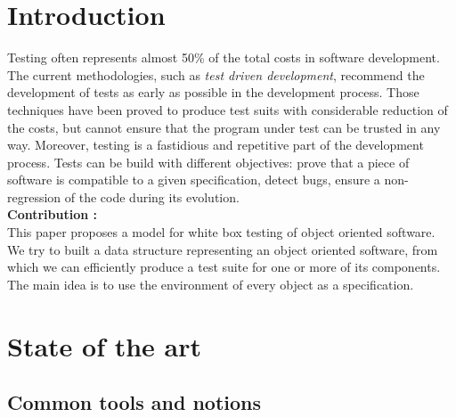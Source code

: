 \documentclass[a4paper]{report}
\begin{document}
\chapter*{Introduction}
Testing often represents almost 50\% of the total costs in software development. The current methodologies, such as \textit{test driven development}, recommend the development of tests as early as possible in the development process. Those techniques have been proved to produce test suits with considerable reduction of the costs, but cannot ensure that the program under test can be trusted in any way. Moreover, testing is a fastidious and repetitive part of the development process.
Tests can be build with different objectives: prove that a piece of software is compatible to a given specification, detect bugs, ensure a non-regression of the code during its evolution.\\
\newline
\textbf{Contribution :}\\
This paper proposes a model for white box testing of object oriented software. We try to built a data structure representing an object oriented software, from which we can efficiently produce a test suite for one or more of its components. The main idea is to use the environment of every object as a specification.\\





\chapter*{State of the art}


\section*{Common tools and notions}
\end{document}
